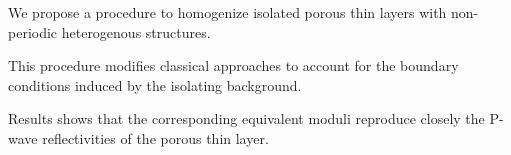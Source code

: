 \documentclass[draft]{agujournal2019}
\begin{document}





\begin{keypoints}
\item We propose a procedure to homogenize isolated porous thin layers with non-periodic heterogenous structures.
\item This procedure modifies classical approaches to account for the boundary conditions induced by the isolating background.
\item Results shows that the corresponding equivalent moduli reproduce closely the P-wave reflectivities of the porous thin layer.


\end{keypoints}

%
%

%
%
\end{document}
